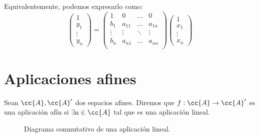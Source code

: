 Equivalentemente, podemos expresarlo como:
\begin{equation*}
    \left(\begin{array}{c}
        1 \\ \hline
        y_1\\ \vdots \\ y_n
    \end{array}\right)
    = \left(\begin{array}{c|ccc}
        1 & 0 & \dots & 0 \\ \hline
        b_{1} & a_{11} & \dots & a_{1n}\\
        \vdots & \vdots & \ddots & \vdots \\
        b_{n} & a_{n1} & \dots & a_{nn}\\
    \end{array}\right)
    \left(\begin{array}{c}
        1\\ \hline
        x_1\\ \vdots \\ x_n
    \end{array}\right)
\end{equation*}


\section{Aplicaciones afines}
\begin{definicion}
    Sean $\cc{A}, \cc{A}'$ dos espacios afines. Diremos que $f:\cc{A}\to \cc{A}'$ es una aplicación afín si $\exists a\in \cc{A}$ tal que
    es una aplicación lineal.
\end{definicion}

\begin{figure}[H]
    \centering
    \caption{Diagrama conmutativo de una aplicación lineal.}
    \label{fig:cd:ApLineal_Basico}
\end{figure}

